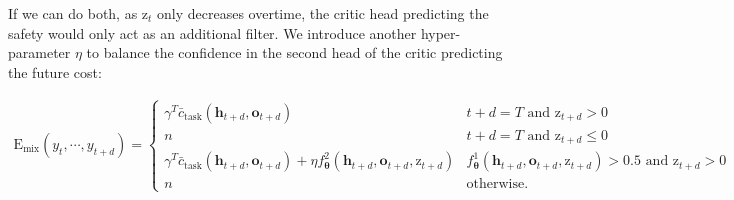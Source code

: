 If we can do both, as $\text{z}_t$ only decreases overtime, the critic head predicting the safety would only act as an additional filter. We introduce another hyper-parameter $\eta$ to balance the confidence in the second head of the critic predicting the future cost: 

\begin{align*}
\text{E}_\text{mix}(y_t, \cdots, y_{t+d}) =
\begin{cases} 
\gamma^T \bar{c}_{\text{task}}(\mathbf{h}_{t+d}, \bm{o}_{t+d}) & t+d = T \text{ and } \text{z}_{t+d} > 0 \\ 
n & t+d = T \text{ and } \text{z}_{t+d} \leq 0 \\ 
\gamma^T \bar{c}_{\text{task}}({\bm h}_{t+d}, \bm{o}_{t+d}) + \eta f^2_{\bm\theta}({\bm h}_{t+d}, {\bm o}_{t+d}, \text{z}_{t+d}) & f^1_{\bm\theta}({\bm h}_{t+d}, {\bm o}_{t+d}, \text{z}_{t+d}) > 0.5 \text{ and }\text{z}_{t+d} > 0 \\ 
n & \text{otherwise}.
\end{cases}
\end{align*}